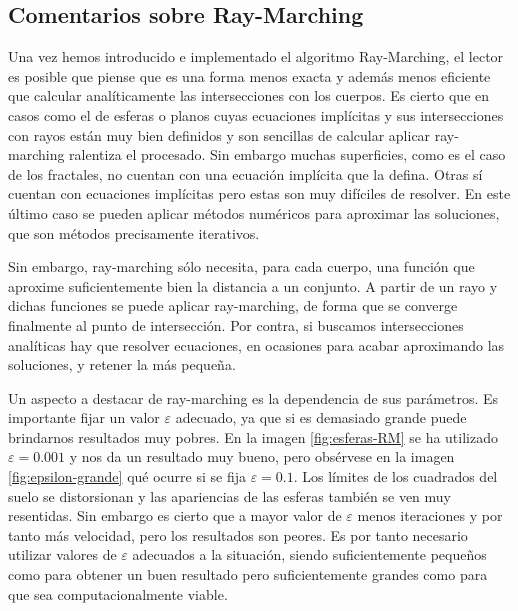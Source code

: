 \subsection{Comentarios sobre Ray-Marching}

Una vez hemos introducido e implementado el algoritmo Ray-Marching, el lector es posible que piense que es una forma menos exacta y además menos eficiente que calcular analíticamente las intersecciones con los cuerpos. Es cierto que en casos como el de esferas o planos cuyas ecuaciones implícitas y sus intersecciones con rayos están muy bien definidos y son sencillas de calcular aplicar ray-marching ralentiza el procesado. Sin embargo muchas superficies, como es el caso de los fractales, no cuentan con una ecuación implícita que la defina. Otras sí cuentan con ecuaciones implícitas pero estas son muy difíciles de resolver. En este último caso se pueden aplicar métodos numéricos para aproximar las soluciones, que son métodos precisamente iterativos. 

Sin embargo, ray-marching sólo necesita, para cada cuerpo, una función que aproxime suficientemente bien la distancia a un conjunto. A partir de un rayo y dichas funciones se puede aplicar ray-marching, de forma que se converge finalmente al punto de intersección. Por contra, si buscamos intersecciones analíticas hay que resolver ecuaciones, en ocasiones para acabar aproximando las soluciones, y retener la más pequeña.

Un aspecto a destacar de ray-marching es la dependencia de sus parámetros. Es importante fijar un valor $\varepsilon$ adecuado, ya que si es demasiado grande puede brindarnos resultados muy pobres. En la imagen \ref{fig:esferas-RM} se ha utilizado $\varepsilon=0.001$ y nos da un resultado muy bueno, pero obsérvese en la imagen \ref{fig:epsilon-grande} qué ocurre si se fija $\varepsilon=0.1$. Los límites de los cuadrados del suelo se distorsionan y las apariencias de las esferas también se ven muy resentidas. Sin embargo es cierto que a mayor valor de $\varepsilon$ menos iteraciones y por tanto más velocidad, pero los resultados son peores. Es por tanto necesario utilizar valores de $\varepsilon$ adecuados a la situación, siendo suficientemente pequeños como para obtener un buen resultado pero suficientemente grandes como para que sea computacionalmente viable.

